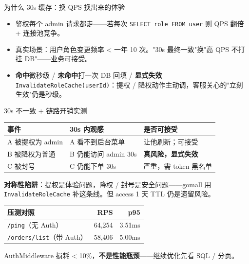 \begin{frame}{为什么 30s 缓存：换 QPS 换出来的体验}
\vspace{2mm}
\begin{itemize}
  \item 鉴权每个 admin 请求都走——若每次 \texttt{SELECT role FROM user} 则 QPS 翻倍 + 连接池竞争。
  \item 真实场景：用户角色变更频率 < 一年 10 次。"30s 最终一致"换"高 QPS 不打挂 DB"——业务可接受。
  \item \textbf{命中}微秒级 / \textbf{未命中}打一次 DB 回填 / \textbf{显式失效} \texttt{InvalidateRoleCache(userId)}：提权 / 降权动作主动调，客服关心的"立刻生效"仍是秒级。
\end{itemize}
\end{frame}

\begin{frame}{30s 不一致 + 链路开销实测}
\begin{tabular}{@{}lll@{}}
\toprule
事件 & 30s 内观感 & 是否可接受 \\
\midrule
A 被提权为 admin & A 看不到后台菜单    & 让他刷新；可接受 \\
B 被降权为普通   & B 仍能访问 admin 30s & \textbf{真风险，显式失效} \\
C 被封号         & C 仍能下单 30s       & 严重，需 token 黑名单 \\
\bottomrule
\end{tabular}
\vspace{2mm}
\small \textbf{对称性陷阱}：提权是体验问题，降权 / 封号是安全问题——gomall 用 \texttt{InvalidateRoleCache} 补这条线。但 access 1 天 TTL 仍是遗留风险。
\vspace{2mm}
\begin{tabular}{@{}lrr@{}}
\toprule
压测对照 & RPS & p95 \\
\midrule
\texttt{/ping}（无 Auth）           & 64{,}254 & 3.51ms \\
\texttt{/orders/list}（带 Auth）    & 58{,}406 & 5.00ms \\
\bottomrule
\end{tabular}
\vspace{1mm}
\small AuthMiddleware 损耗 < 10\%，\textbf{不是性能瓶颈}——继续优化先看 SQL / 分页。
\end{frame}

